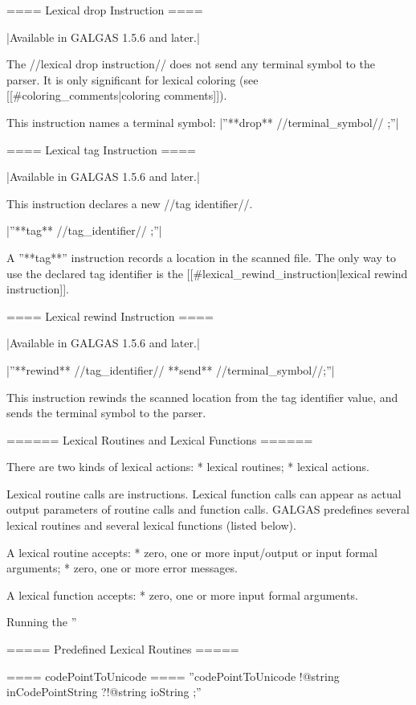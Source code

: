 {==== Lexical drop Instruction ====

|Available in GALGAS 1.5.6 and later.|


The //lexical drop instruction// does not send any terminal symbol to the parser. It is only significant for lexical coloring (see [[\#coloring\_comments|coloring comments]]).

This instruction names a terminal symbol:
|''**drop** //terminal\_symbol// ;''|


==== Lexical tag Instruction ====

|Available in GALGAS 1.5.6 and later.|

This instruction declares a new //tag identifier//.

|''**tag** //tag\_identifier// ;''|

A ''**tag**'' instruction records a location in the scanned file. The only way to use the declared tag identifier is the [[\#lexical\_rewind\_instruction|lexical rewind instruction]].

==== Lexical rewind Instruction ====

|Available in GALGAS 1.5.6 and later.|

|''**rewind** //tag\_identifier// **send** //terminal\_symbol//;''|

This instruction rewinds the scanned location from the tag identifier value, and sends the terminal symbol to the parser.

====== Lexical Routines and Lexical Functions ======


There are two kinds of lexical actions:
  * lexical routines;
  * lexical actions.

Lexical routine calls are instructions. Lexical function calls can appear as actual output parameters of routine calls and function calls. GALGAS predefines several lexical routines and several lexical functions (listed below).

A lexical routine accepts:
  * zero, one or more input/output or input formal arguments;
  * zero, one or more error messages.

A lexical function accepts:
  * zero, one or more input formal arguments.

Running the ''%

===== Predefined Lexical Routines =====


==== codePointToUnicode ====
''codePointToUnicode !@string inCodePointString ?!@string ioString ;''

}
